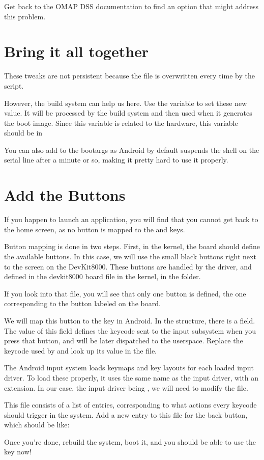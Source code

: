 Get back to the OMAP DSS documentation to find an option that might
address this problem.

\section{Bring it all together}

These tweaks are not persistent because the  file is
overwritten every time by the 
script.

However, the build system can help us here. Use the
 variable to set these new value. It will
be processed by the build system and then used when it generates the
boot image. Since this variable is related to the hardware, this
variable should be in 

You can also add  to the bootargs as Android
by default suspends the shell on the serial line after a minute or so,
making it pretty hard to use it properly.

\section{Add the Buttons}

If you happen to launch an application, you will find that you cannot
get back to the home screen, as no button is mapped to the 
and  keys.

Button mapping is done in two steps. First, in the kernel, the board
should define the available buttons. In this case, we will use the
small black buttons right next to the screen on the DevKit8000. These
buttons are handled by the  driver, and defined in the
devkit8000 board file in the kernel, in the 
folder.

If you look into that file, you will see that only one button is
defined, the one corresponding to the button labeled 
on the board.

We will map this button to the  key in Android. In the
 structure, there is a  field. The
value of this field defines the keycode sent to the input subsystem
when you press that button, and will be later dispatched to the
userspace. Replace the keycode used by  and look up its
value in the  file.

The Android input system loads keymaps and key layouts for each loaded
input driver. To load these properly, it uses the same name as the
input driver, with an extension. In our case, the input driver being
, we will need to modify the  file.

This file consists of a list of entries, corresponding to what actions
every keycode should trigger in the system. Add a new entry to this
file for the back button, which should be like:

Once you're done, rebuild the system, boot it, and you should be able
to use the  key now!
